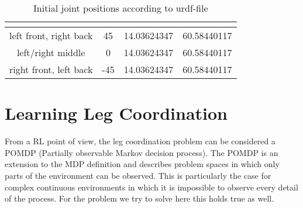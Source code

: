 \begin{table}[h!]
	\centering
	\begin{tabular}{| c | c | c | c |} 
		\hline
		 & \textbf{\textalpha} & \textbf{\textbeta} & \textbf{\textgamma} \\ [0.5ex] 
		\hline
		\hline
		left front, right back & 45 & 14.03624347 & 60.58440117  \\ 
		
		left/right middle & 0 & 14.03624347 & 60.58440117 \\
		
		right front, left back & -45 & 14.03624347 & 60.58440117 \\
		\hline
	\end{tabular}
	\caption{Initial joint positions according to urdf-file}
	\label{table:Initial joint positions}
\end{table}


\section{Learning Leg Coordination} \label{sec: RL setup}
From a RL point of view, the leg coordination problem can be considered a POMDP (Partially observable Markov decision process).
The POMDP is an extension to the MDP definition and describes problem spaces in which only parts of the environment can be observed.
This is particularly the case for complex continuous environments in which it is impossible to observe every detail of the process.
For the problem we try to solve here this holds true as well.

